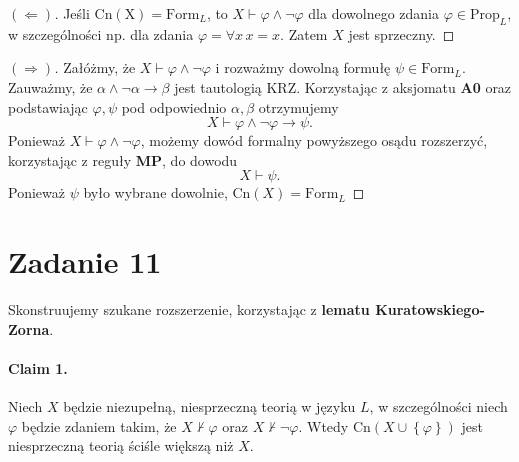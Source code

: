 \begin{proof}[\((\Leftarrow)\)]
    Jeśli \( \mathrm{Cn(X)} = \mathrm{Form}_L \), to \( X \vdash \varphi \wedge \neg\varphi \) dla dowolnego zdania \( \varphi \in \mathrm{Prop}_L \), w szczególności np. dla zdania \( \varphi = \forall x\, x = x \). Zatem \( X \) jest sprzeczny.
\end{proof}

\begin{proof}[\( (\Rightarrow) \)]
Załóżmy, że \( X \vdash \varphi \wedge \neg \varphi \) i rozważmy dowolną formułę \( \psi \in \mathrm{Form}_L \).
Zauważmy, że \( \alpha \wedge \neg \alpha \to \beta \) jest tautologią KRZ. Korzystając z aksjomatu \textbf{A0} oraz podstawiając \( \varphi, \psi \) pod odpowiednio \( \alpha, \beta \) otrzymujemy
\[ 
    X \vdash \varphi \wedge \neg \varphi \to \psi.
\]
Ponieważ \( X \vdash \varphi \wedge \neg \varphi \), możemy dowód formalny powyższego osądu rozszerzyć, korzystając z reguły \textbf{MP}, do dowodu
\[ 
    X \vdash \psi. 
\]
Ponieważ \( \psi \) było wybrane dowolnie, \( \mathrm{Cn}(X) = \mathrm{Form}_L \)
\end{proof}

\newpage
\section*{Zadanie 11}

Skonstruujemy szukane rozszerzenie, korzystając z \textbf{lematu Kuratowskiego-Zorna}. 

\paragraph{Claim 1.} Niech \( X \) będzie niezupełną, niesprzeczną teorią w języku \( L \), w szczególności niech \( \varphi \) będzie zdaniem takim, że \( X \not\vdash \varphi \) oraz \( X \not\vdash \neg\varphi \). Wtedy \( \mathrm{Cn}(X \cup \left\{ \varphi \right\}) \) jest niesprzeczną teorią ściśle większą niż \( X \).

